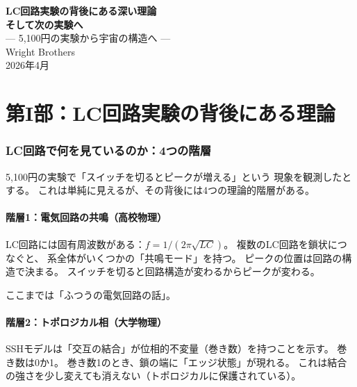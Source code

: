 \documentclass[12pt,a4paper]{article}
\begin{document}
\begin{center}
{\LARGE\bfseries LC回路実験の背後にある深い理論}\\[0.3cm]
{\LARGE\bfseries そして次の実験へ}\\[0.5cm]
{\large --- 5,100円の実験から宇宙の構造へ ---}\\[1.5cm]
{\large Wright Brothers}\\[0.3cm]
{2026年4月}
\end{center}

\vspace{0.5cm}
\tableofcontents
\newpage


\part*{第I部：LC回路実験の背後にある理論}

\section{LC回路で何を見ているのか：4つの階層}

5,100円の実験で「スイッチを切るとピークが増える」という
現象を観測したとする。
これは単純に見えるが、その背後には4つの理論的階層がある。

\subsection{階層1：電気回路の共鳴（高校物理）}

LC回路には固有周波数がある：$f = 1/(2\pi\sqrt{LC})$。
複数のLC回路を鎖状につなぐと、
系全体がいくつかの「共鳴モード」を持つ。
ピークの位置は回路の構造で決まる。
スイッチを切ると回路構造が変わるからピークが変わる。

ここまでは「ふつうの電気回路の話」。

\subsection{階層2：トポロジカル相（大学物理）}

SSHモデルは「交互の結合」が位相的不変量（巻き数）を持つことを示す。
巻き数は0か1。
巻き数1のとき、鎖の端に「エッジ状態」が現れる。
これは結合の強さを少し変えても消えない（トポロジカルに保護されている）。
\end{document}
